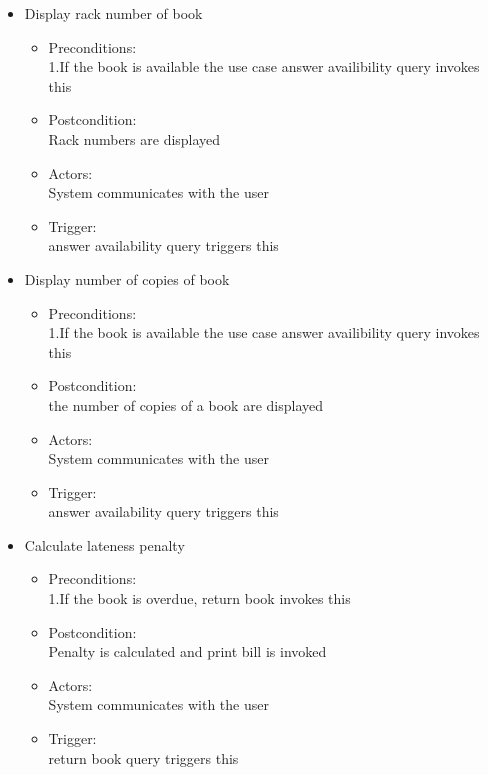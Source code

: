\documentclass{article}
\begin{document}
\begin{enumerate}
\begin{itemize}
\item Display rack number of book\\ 
	\begin{itemize}
	\item  Preconditions:\\ 1.If the book is available the use case answer availibility query invokes this\\ 
 \item Postcondition:\\  Rack numbers are displayed\\ 
 \item Actors:\\  System communicates with the user\\ 
 \item Trigger:\\  answer availability query triggers this\\ 
	\end{itemize}
 
 \item Display number of copies of book\\ 
	\begin{itemize}
	\item  Preconditions:\\ 1.If the book is available the use case answer availibility query invokes this\\ 
 \item Postcondition:\\  the number of copies of a book are displayed\\ 
 \item Actors: \\ System communicates with the user\\ 
 \item Trigger:\\  answer availability query triggers this\\ 
	\end{itemize}

\item Calculate lateness penalty\\ 
	\begin{itemize}
	\item  Preconditions:\\ 1.If the book is overdue, return book invokes this\\ 
 \item Postcondition:\\ Penalty is calculated and print bill is invoked\\ 
 \item Actors: \\ System communicates with the user\\ 
 \item Trigger: \\ return book query triggers this\\ 
	\end{itemize}
 

\end{itemize}
\end{enumerate}
\end{document}
